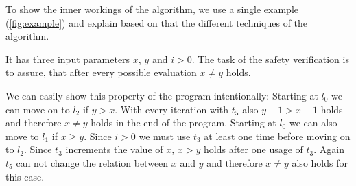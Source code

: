 

To show the inner workings of the algorithm, we use a single example (\ref{fig:example}) and explain based on that the different techniques of the algorithm.

It has three input parameters $x$, $y$ and $i>0$.
The task of the safety verification is to assure, that after every possible evaluation $x \neq y$ holds.

We can easily show this property of the program intentionally:
Starting at $l_0$ we can move on to $l_2$ if $y>x$.
With every iteration with $t_5$ also $y+1>x+1$ holds and therefore $x \neq y$ holds in the end of the program.
Starting at $l_0$ we can also move to $l_1$ if $x \geq y$.
Since $i>0$ we must use $t_3$ at least one time before moving on to $l_2$.
Since $t_3$ increments the value of $x$, $x > y$ holds after one usage of $t_3$.
Again $t_5$ can not change the relation between $x$ and $y$ and therefore $x \neq y$ also holds for this case.
